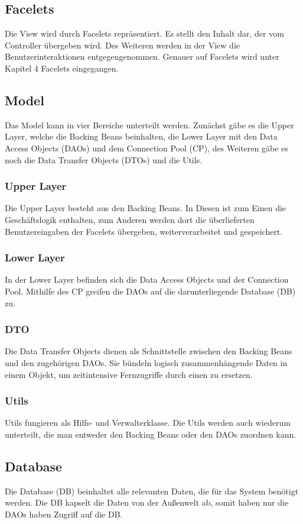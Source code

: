     \subsection{Facelets}
    	Die View wird durch Facelets repräsentiert. Es stellt den Inhalt dar, der vom Controller übergeben wird. Des Weiteren werden in der View die Benutzerinteraktionen entgegengenommen. Genauer auf Facelets wird unter Kapitel 4 Facelets eingegangen.
   	\subsection{Model}
   	Das Model kann in vier Bereiche unterteilt werden. Zunächst gäbe es die Upper Layer, welche die Backing Beans beinhalten, die Lower Layer mit den Data Access Objects (DAOs) und dem Connection Pool (CP), des Weiteren gäbe es noch die Data Transfer Objects (DTOs) und die Utils. 
   		\subsubsection{Upper Layer}
   		Die \glqq Upper Layer\grqq{} besteht aus den Backing Beans. In Diesen ist zum Einen die Geschäftslogik enthalten, zum Anderen werden dort die überlieferten Benutzereingaben der Facelets übergeben, weiterverarbeitet und gespeichert.
    	\subsubsection{Lower Layer}
    	In der \glqq Lower Layer\grqq{} befinden sich die Data Access Objects und der Connection Pool. Mithilfe des CP greifen die DAOs auf die darunterliegende Database (DB) zu.
    	\subsubsection{DTO}
    	Die Data Transfer Objects dienen als Schnittstelle zwischen den Backing Beans und den zugehörigen DAOs. Sie bündeln logisch zusammenhängende Daten in einem Objekt, um zeitintensive Fernzugriffe durch einen zu ersetzen.
    	\subsubsection{Utils}
    	Utils fungieren als Hilfs- und Verwalterklasse. Die Utils werden auch wiederum unterteilt, die man entweder den Backing Beans oder den DAOs zuordnen kann. 
    \subsection{Database}
    Die Database (DB) beinhaltet alle relevanten Daten, die für das System benötigt werden. Die DB kapselt die Daten von der Außenwelt ab, somit haben nur die DAOs haben Zugriff auf die DB. 
